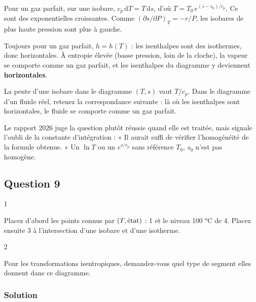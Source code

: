 \documentclass[11pt,a4paper]{article}
\begin{document}
Pour un gaz parfait, sur une isobare, \(c_p\,\mathrm{d}T=T\,\mathrm{d}s\), d'où \(\boxed{T=T_0\,e^{(s-s_0)/c_p}}\). Ce sont des exponentielles croissantes. Comme \((\partial s/\partial P)_T=-r/P\), les isobares de plus haute pression sont plus à gauche.

Toujours pour un gaz parfait, \(h=h(T)\) : les isenthalpes sont des isothermes, donc horizontales. À entropie élevée (basse pression, loin de la cloche), la vapeur se comporte comme un gaz parfait, et les isenthalpes du diagramme y deviennent \textbf{horizontales}.

\begin{methode}

La pente d'une isobare dans le diagramme \((T,s)\) vaut \(T/c_p\). Dans le diagramme d'un fluide réel, retenez la correspondance suivante : là où les isenthalpes sont horizontales, le fluide se comporte comme un gaz parfait.

\end{methode}

\begin{jury}

Le rapport 2026 juge la question plutôt réussie quand elle est traitée, mais signale l'oubli de la constante d'intégration : « Il aurait suffi de vérifier l'homogénéité de la formule obtenue. » Un \(\ln T\) ou un \(e^{s/c_p}\) sans référence \(T_0\), \(s_0\) n'est pas homogène.

\end{jury}

\hypertarget{question-9}{%
\subsection{Question 9}\label{question-9}}

\begin{indication}{1}

Placez d'abord les points connus par \((T,\text{\text{état}})\) : 1 et le niveau 100 °C de 4. Placez ensuite 3 à l'intersection d'une isobare et d'une isotherme.

\end{indication}

\begin{indication}{2}

Pour les transformations isentropiques, demandez-vous quel type de segment elles donnent dans ce diagramme.

\end{indication}

\hypertarget{solution-8}{%
\subsubsection{Solution}\label{solution-8}}
\end{document}
